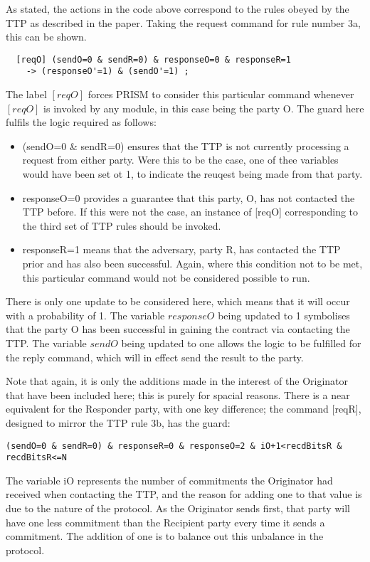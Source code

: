 \documentclass{l4proj}
\begin{document}
As stated, the actions in the code above correspond to the rules obeyed by the TTP as described in the paper. Taking the request command for rule number 3a, this can be shown.

\begin{lstlisting}
  [reqO] (sendO=0 & sendR=0) & responseO=0 & responseR=1 
    -> (responseO'=1) & (sendO'=1) ;
\end{lstlisting}
The label $[reqO]$ forces PRISM to consider this particular command whenever $[reqO]$ is invoked by any module, in this case being the party O. The guard here fulfils the logic required as follows:
\begin{itemize}
\item (sendO=0 \& sendR=0) ensures that the TTP is not currently processing a request from either party. Were this to be the case, one of thee variables would have been set ot 1, to indicate the reuqest being made from that party.
\item responseO=0 provides a guarantee that this party, O, has not contacted the TTP before. If this were not the case, an instance of [reqO] corresponding to the third set of TTP rules should be invoked.
\item responseR=1 means that the adversary, party R, has contacted the TTP prior and has also been successful. Again, where this condition not to be met, this particular command would not be considered possible to run.
\end{itemize}
There is only one update to be considered here, which means that it will occur with a probability of 1. The variable $responseO$ being updated to 1 symbolises that the party O has been successful in gaining the contract via contacting the TTP. The variable $sendO$ being updated to one allows the logic to be fulfilled for the reply command, which will in effect send the result to the party. 


 Note that again, it is only the additions made in the interest of the Originator that have been included here; this is purely for spacial reasons. There is a near equivalent for the Responder party, with one key difference; the command [reqR], designed to mirror the TTP rule 3b, has the guard:
\begin{lstlisting}
(sendO=0 & sendR=0) & responseR=0 & responseO=2 & iO+1<recdBitsR & recdBitsR<=N
\end{lstlisting}
The variable iO represents the number of commitments the Originator had received when contacting the TTP, and the reason for adding one to that value is due to the nature of the protocol. As the Originator sends first, that party will have one less commitment than the Recipient party every time it sends a commitment. The addition of one is to balance out this unbalance in the protocol. 
\end{document}
